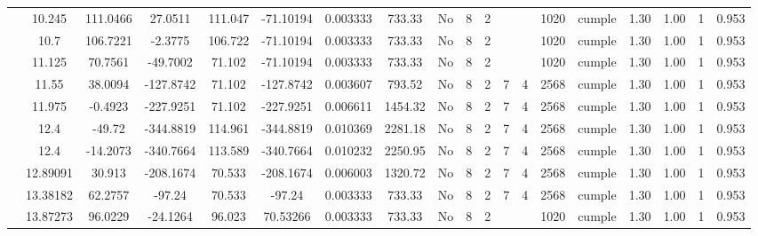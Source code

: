 \begin{table}[H]
{\begin{tabular}{|c|c|c|c|c|c|r|c|c|c|c|c|c|c|c|c|c|c|c|}
\cline{2-19}        & 10.245 & 111.0466 & 27.0511 & 111.047 & -71.10194 & 0.003333 & 733.33 & No  & 8   & 2   &     &     & 1020 & \cellcolor[rgb]{ .776,  .937,  .808}cumple & 1.30 & 1.00 & 1   & 0.953 \bigstrut\\
\cline{2-19}        & 10.7 & 106.7221 & -2.3775 & 106.722 & -71.10194 & 0.003333 & 733.33 & No  & 8   & 2   &     &     & 1020 & \cellcolor[rgb]{ .776,  .937,  .808}cumple & 1.30 & 1.00 & 1   & 0.953 \bigstrut\\
\cline{2-19}        & 11.125 & 70.7561 & -49.7002 & 71.102 & -71.10194 & 0.003333 & 733.33 & No  & 8   & 2   &     &     & 1020 & \cellcolor[rgb]{ .776,  .937,  .808}cumple & 1.30 & 1.00 & 1   & 0.953 \bigstrut\\
\cline{2-19}        & 11.55 & 38.0094 & -127.8742 & 71.102 & -127.8742 & 0.003607 & 793.52 & No  & 8   & 2   & 7   & 4   & 2568 & \cellcolor[rgb]{ .776,  .937,  .808}cumple & 1.30 & 1.00 & 1   & 0.953 \bigstrut\\
\cline{2-19}        & 11.975 & -0.4923 & -227.9251 & 71.102 & -227.9251 & 0.006611 & 1454.32 & No  & 8   & 2   & 7   & 4   & 2568 & \cellcolor[rgb]{ .776,  .937,  .808}cumple & 1.30 & 1.00 & 1   & 0.953 \bigstrut\\
\cline{2-19}        & \cellcolor[rgb]{ .851,  .882,  .949}12.4 & -49.72 & -344.8819 & 114.961 & -344.8819 & 0.010369 & 2281.18 & No  & 8   & 2   & 7   & 4   & 2568 & \cellcolor[rgb]{ .776,  .937,  .808}cumple & 1.30 & 1.00 & 1   & 0.953 \bigstrut\\
\cline{2-19}        & \cellcolor[rgb]{ .851,  .882,  .949}12.4 & -14.2073 & -340.7664 & 113.589 & -340.7664 & 0.010232 & 2250.95 & No  & 8   & 2   & 7   & 4   & 2568 & \cellcolor[rgb]{ .776,  .937,  .808}cumple & 1.30 & 1.00 & 1   & 0.953 \bigstrut\\
\cline{2-19}        & 12.89091 & 30.913 & -208.1674 & 70.533 & -208.1674 & 0.006003 & 1320.72 & No  & 8   & 2   & 7   & 4   & 2568 & \cellcolor[rgb]{ .776,  .937,  .808}cumple & 1.30 & 1.00 & 1   & 0.953 \bigstrut\\
\cline{2-19}        & 13.38182 & 62.2757 & -97.24 & 70.533 & -97.24 & 0.003333 & 733.33 & No  & 8   & 2   & 7   & 4   & 2568 & \cellcolor[rgb]{ .776,  .937,  .808}cumple & 1.30 & 1.00 & 1   & 0.953 \bigstrut\\
\cline{2-19}        & 13.87273 & 96.0229 & -24.1264 & 96.023 & 70.53266 & 0.003333 & 733.33 & No  & 8   & 2   &     &     & 1020 & \cellcolor[rgb]{ .776,  .937,  .808}cumple & 1.30 & 1.00 & 1   & 0.953 \bigstrut\\

\end{tabular}}
\end{table}
